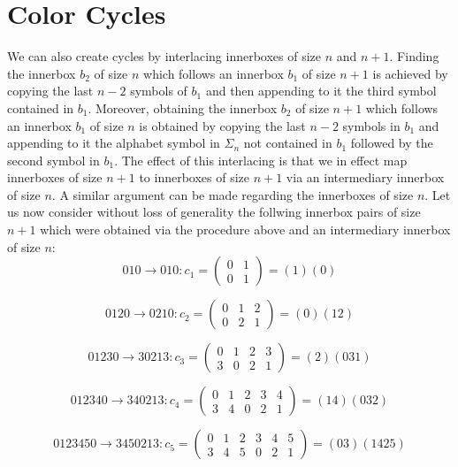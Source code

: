 \documentclass[a4paper,10pt]{article}
\begin{document}
\section{Color Cycles}
We can also create cycles by interlacing innerboxes of size $n$ and $n+1$. Finding the innerbox $b_2$ of size $n$ which follows an innerbox $b_1$ of size $n+1$ is achieved by copying the last $n-2$ symbols of $b_1$ and then appending to it the third symbol contained in $b_1$. Moreover, obtaining the innerbox $b_2$ of size $n+1$ which follows an innerbox $b_1$ of size $n$ is obtained by copying the last $n-2$ symbols in $b_1$ and appending to it the alphabet symbol in $\Sigma_n$ not contained in $b_1$ followed by the second symbol in $b_1$. The effect of this interlacing is that we in effect map innerboxes of size $n+1$ to innerboxes of size $n+1$ via an intermediary innerbox of size $n$. A similar argument can be made regarding the innerboxes of size $n$. Let us now consider without loss of generality the follwing innerbox pairs of size $n+1$ which were obtained via the procedure above and an intermediary innerbox of size $n$:
\begin{equation}
010\rightarrow010:c_1=
\begin{pmatrix}
0&1\\
0&1
\end{pmatrix} = (1)(0)
\end{equation}

\begin{equation}
0120\rightarrow0210:c_2=
\begin{pmatrix}
0&1&2\\
0&2&1
\end{pmatrix} = (0)(12)
\end{equation}

\begin{equation}
01230\rightarrow30213:c_3=
\begin{pmatrix}
0&1&2&3\\
3&0&2&1
\end{pmatrix} = (2)(031)
\end{equation}

\begin{equation}
012340\rightarrow340213:c_4=
\begin{pmatrix}
0&1&2&3&4\\
3&4&0&2&1
\end{pmatrix} = (14)(032)
\end{equation}

\begin{equation}
0123450\rightarrow3450213:c_5=
\begin{pmatrix}
0&1&2&3&4&5\\
3&4&5&0&2&1
\end{pmatrix} = (03)(1425)
\end{equation}
\end{document}
